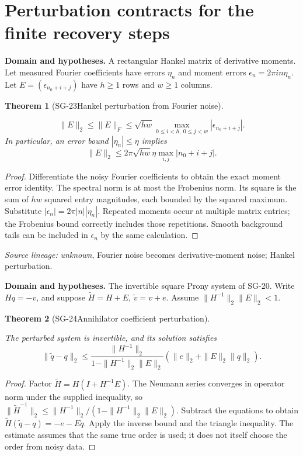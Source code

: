 \documentclass[11pt]{article}
\newtheorem{theorem}{Theorem}[section]
\theoremstyle{definition}\newtheorem{definition}[theorem]{Definition}
\theoremstyle{remark}\newtheorem{remark}[theorem]{Remark}
\begin{document}
\section{Perturbation contracts for the finite recovery steps}


\par{\small\textbf{Domain and hypotheses.} A rectangular Hankel matrix of derivative moments. Let measured Fourier coefficients have errors $\eta_n$ and moment errors $\epsilon_n=2\pi in\eta_n$. Let $E=(\epsilon_{n_0+i+j})$ have $h\ge1$ rows and $w\ge1$ columns.}\par
\begin{theorem}[SG-23\quad Hankel perturbation from Fourier noise]\label{SG-23}

\[
 \|E\|_2\le\|E\|_F
 \le\sqrt{hw}\max_{0\le i<h,\ 0\le j<w}|\epsilon_{n_0+i+j}|.
\]
In particular, an error bound $|\eta_n|\le\eta$ implies
\[
 \|E\|_2\le2\pi\sqrt{hw}\eta\max_{i,j}|n_0+i+j|.
\]

\end{theorem}
\begin{proof}

Differentiate the noisy Fourier coefficients to obtain the exact moment
error identity. The spectral norm is at most the Frobenius norm. Its square
is the sum of $hw$ squared entry magnitudes, each bounded by the squared
maximum. Substitute $|\epsilon_n|=2\pi|n||\eta_n|$.
Repeated moments occur at multiple matrix entries; the Frobenius bound
correctly includes those repetitions. Smooth background tails can be included
in $\epsilon_n$ by the same calculation.

\end{proof}

\par{\small\color{Teal}\textit{Source lineage:} \textit{unknown}, Fourier noise becomes derivative-moment noise; Hankel perturbation.}\par

\par{\small\textbf{Domain and hypotheses.} The invertible square Prony system of SG-20. Write $Hq=-v$, and suppose $\widetilde H=H+E$, $\widetilde v=v+e$. Assume $\|H^{-1}\|_2\|E\|_2<1$.}\par
\begin{theorem}[SG-24\quad Annihilator coefficient perturbation]\label{SG-24}

The perturbed system is invertible, and its solution satisfies
\[
 \|\widetilde q-q\|_2
 \le\frac{\|H^{-1}\|_2}{1-\|H^{-1}\|_2\|E\|_2}
       (\|e\|_2+\|E\|_2\|q\|_2).
\]

\end{theorem}
\begin{proof}

Factor $\widetilde H=H(I+H^{-1}E)$. The Neumann series converges in operator
norm under the supplied inequality, so
$\|\widetilde H^{-1}\|_2\le
\|H^{-1}\|_2/(1-\|H^{-1}\|_2\|E\|_2)$.
Subtract the equations to obtain
$\widetilde H(\widetilde q-q)=-e-Eq$. Apply the inverse bound and the
triangle inequality. The estimate assumes that the same true order is used;
it does not itself choose the order from noisy data.

\end{proof}
\end{document}
